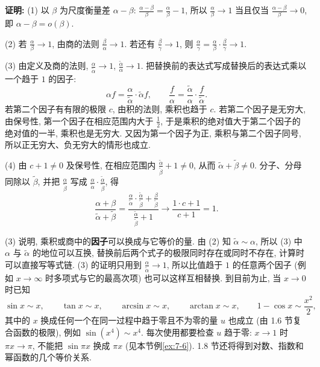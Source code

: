 \documentclass[UTF8,openany]{ctexbook}
\theoremstyle{chinesetextbook}
\newenvironment{cnproof}{\par\indent\textbf{证明:} \ignorespaces}{\par}
\begin{document}
\begin{cnproof}
(1) 以 $\beta$ 为尺度衡量差 $\alpha-\beta$: $\displaystyle\frac{\alpha-\beta}\beta=\frac\alpha\beta-1$, 所以 $\displaystyle\frac\alpha\beta\to1$ 当且仅当 $\displaystyle\frac{\alpha-\beta}\beta\to0$, 即 $\alpha-\beta=o(\beta)$.

(2) 若 $\displaystyle\frac\alpha\beta\to1$, 由商的法则 $\displaystyle\frac\beta\alpha\to1$. 若还有 $\displaystyle\frac\beta\gamma\to1$, 则 $\displaystyle\frac\alpha\gamma=\frac\alpha\beta\cdot\frac\beta\gamma\to1$.

(3) 由定义及商的法则, $\displaystyle\frac\alpha{\widetilde\alpha}\to1$, $\displaystyle\frac{\widetilde\alpha}\alpha\to1$. 把替换前的表达式写成替换后的表达式乘以一个趋于 $1$ 的因子:
\[
\alpha f=\frac\alpha{\widetilde\alpha}\cdot\widetilde\alpha f,\qquad\frac f\alpha=\frac{\widetilde\alpha}\alpha\cdot\frac f{\widetilde\alpha}.
\]
若第二个因子有有限的极限 $c$, 由积的法则, 乘积也趋于 $c$. 若第二个因子是无穷大, 由保号性, 第一个因子在相应范围内大于 $\displaystyle\frac12$, 于是乘积的绝对值大于第二个因子的绝对值的一半, 乘积也是无穷大. 又因为第一个因子为正, 乘积与第二个因子同号, 所以正无穷大、负无穷大的情形也成立.

(4) 由 $c+1\ne0$ 及保号性, 在相应范围内 $\displaystyle\frac{\widetilde\alpha}{\widetilde\beta}+1\ne0$, 从而 $\widetilde\alpha+\widetilde\beta\ne0$. 分子、分母同除以 $\widetilde\beta$, 并把 $\displaystyle\frac\alpha{\widetilde\beta}$ 写成 $\displaystyle\frac\alpha{\widetilde\alpha}\cdot\frac{\widetilde\alpha}{\widetilde\beta}$, 得
\[
\frac{\alpha+\beta}{\widetilde\alpha+\widetilde\beta}=\frac{\frac\alpha{\widetilde\alpha}\cdot\frac{\widetilde\alpha}{\widetilde\beta}+\frac\beta{\widetilde\beta}}{\frac{\widetilde\alpha}{\widetilde\beta}+1}\to\frac{1\cdot c+1}{c+1}=1.
\]
\end{cnproof}
(3) 说明, 乘积或商中的\textbf{因子}可以换成与它等价的量. 由 (2) 知 $\widetilde\alpha\sim\alpha$, 所以 (3) 中 $\alpha$ 与 $\widetilde\alpha$ 的地位可以互换, 替换前后两个式子的极限同时存在或同时不存在, 计算时可以直接写等式链. (3) 的证明只用到 $\displaystyle\frac\alpha{\widetilde\alpha}\to1$, 所以比值趋于 $1$ 的任意两个因子 (例如 $x\to\infty$ 时多项式与它的最高次项) 也可以这样互相替换. 到目前为止, 当 $x\to0$ 时已知
\[
\sin x\sim x,\qquad\tan x\sim x,\qquad\arcsin x\sim x,\qquad\arctan x\sim x,\qquad1-\cos x\sim\frac{x^2}2,
\]
其中的 $x$ 换成任何一个在同一过程中趋于零且不为零的量 $u$ 也成立 (由 1.6 节复合函数的极限), 例如 $\sin(x^4)\sim x^4$. 每次使用都要检查 $u$ 趋于零: $x\to1$ 时 $\pi x\to\pi$, 不能把 $\sin\pi x$ 换成 $\pi x$ (见本节例\ref{ex:7-6}). 1.8 节还将得到对数、指数和幂函数的几个等价关系.
\end{document}
